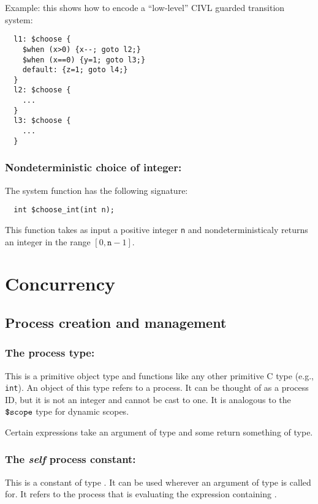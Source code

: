 Example: this shows how to encode a ``low-level'' CIVL guarded
transition system:

\begin{verbatim}
  l1: $choose {
    $when (x>0) {x--; goto l2;}
    $when (x==0) {y=1; goto l3;}
    default: {z=1; goto l4;}
  }
  l2: $choose {
    ...
  }
  l3: $choose {
    ...
  }
\end{verbatim}


\subsection{Nondeterministic choice of integer:
  \texorpdfstring{\cchooseint}{\$choose\_int}}

The system function \cchooseint{} has the following signature:
\begin{verbatim}
  int $choose_int(int n);
\end{verbatim}
This function takes as input a positive integer \texttt{n} and
nondeterministicaly returns an integer in the range
$[0,\texttt{n}-1]$.


\chapter{Concurrency}
\label{chap:concurrency}

\section{Process creation and management}

\subsection{The process type: \cproc}

This is a primitive object type and functions like any other primitive
C type (e.g., \texttt{int}). An object of this type refers to a
process. It can be thought of as a process ID, but it is not an
integer and cannot be cast to one.  It is analogous to the $\mbox{\texttt{\${}scope}}$
type for dynamic scopes.

Certain expressions take an argument of \cproc{} type and some return
something of \cproc{} type.

\subsection{The \emph{self} process constant: \cself}

This is a constant of type \cproc. It can be used wherever an argument
of type \cproc{} is called for. It refers to the process that is
evaluating the expression containing \cself.

